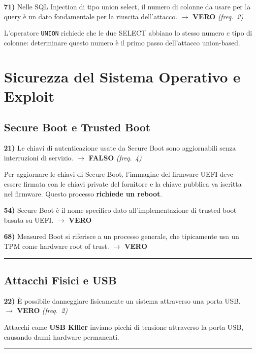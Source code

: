\documentclass[12pt, a4paper]{report}
\newcommand{\vero}{\textcolor{verdeanswer}{\textbf{VERO}}}
\newcommand{\falso}{\textcolor{rossoanswer}{\textbf{FALSO}}}
\newcommand{\freq}[1]{\textcolor{freqcolor}{\textit{(freq.\ #1)}}}
\begin{document}
\medskip
\noindent\textbf{71)} Nelle SQL Injection di tipo union select, il numero di colonne da usare per la query è un dato fondamentale per la riuscita dell'attacco. $\to$ \vero{} \freq{2}

\medskip
\noindent L'operatore \texttt{UNION} richiede che le due SELECT abbiano lo stesso numero e tipo di colonne: determinare questo numero è il primo passo dell'attacco union-based.

\chapter{Sicurezza del Sistema Operativo e Exploit}

\section{Secure Boot e Trusted Boot}

\noindent\textbf{21)} Le chiavi di autenticazione usate da Secure Boot sono aggiornabili senza interruzioni di servizio. $\to$ \falso{} \freq{4}

\medskip
\noindent Per aggiornare le chiavi di Secure Boot, l'immagine del firmware UEFI deve essere firmata con le chiavi private del fornitore e la chiave pubblica va iscritta nel firmware. Questo processo \textbf{richiede un reboot}.

\medskip
\noindent\textbf{54)} Secure Boot è il nome specifico dato all'implementazione di trusted boot basata su UEFI. $\to$ \vero{}

\medskip
\noindent\textbf{68)} Measured Boot si riferisce a un processo generale, che tipicamente usa un TPM come hardware root of trust. $\to$ \vero{}

\noindent\rule{\textwidth}{0.4pt}

\section{Attacchi Fisici e USB}

\noindent\textbf{22)} È possibile danneggiare fisicamente un sistema attraverso una porta USB. $\to$ \vero{} \freq{2}

\medskip
\noindent Attacchi come \textbf{USB Killer} inviano picchi di tensione attraverso la porta USB, causando danni hardware permanenti.

\noindent\rule{\textwidth}{0.4pt}
\end{document}
